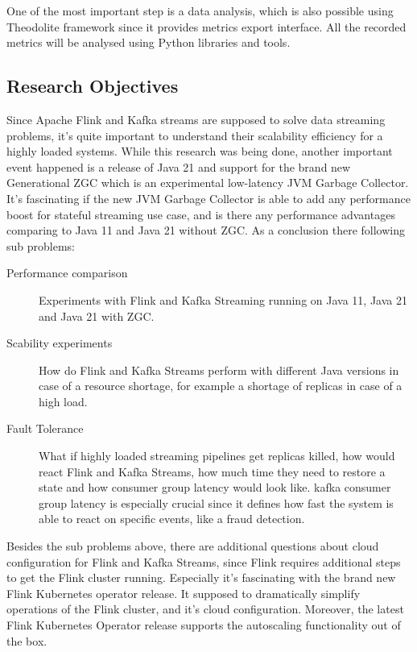 One of the most important step is a data analysis, which is also possible using Theodolite framework
since it provides metrics export interface.
All the recorded metrics will be analysed using Python libraries and tools.


\subsection{Research Objectives}\label{sec:research-objectives}
Since Apache Flink and Kafka streams are supposed to solve data streaming problems, it's
quite important to understand their scalability efficiency for a highly loaded systems.
While this research was being done, another important event happened is a release of Java 21
and support for the brand new Generational ZGC which is an experimental low-latency JVM
Garbage Collector.
It's fascinating if the new JVM Garbage Collector is able to add any performance boost for
stateful streaming use case, and is there any performance advantages comparing to Java 11
and Java 21 without ZGC.
As a conclusion there following sub problems:

\begin{description}
    \item[Performance comparison] Experiments with Flink and Kafka Streaming running on Java 11,
    Java 21 and Java 21 with ZGC.
    \item[Scability experiments] How do Flink and Kafka Streams perform with different Java versions
    in case of a resource shortage, for example a shortage of replicas in case of a high load.
    \item[Fault Tolerance] What if highly loaded streaming pipelines get replicas killed, how
    would react Flink and Kafka Streams, how much time they need to restore a state and how consumer
    group latency would look like.
    kafka consumer group latency is especially crucial since it defines how fast the system
    is able to react on specific events, like a fraud detection.
\end{description}

Besides the sub problems above, there are additional questions about cloud configuration for Flink
and Kafka Streams, since Flink requires additional steps to get the Flink cluster running.
Especially it's fascinating with the brand new Flink Kubernetes operator release.
It supposed to dramatically simplify operations of the Flink cluster, and it's cloud configuration.
Moreover, the latest Flink Kubernetes Operator release supports the autoscaling functionality out of the box.

